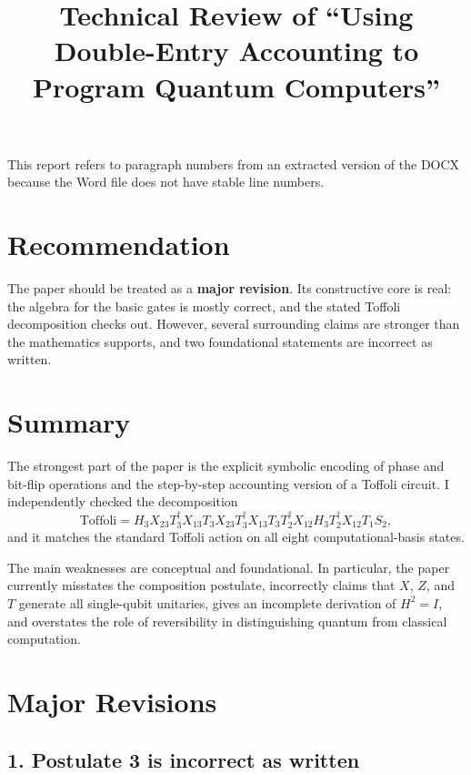 \documentclass[11pt]{article}
\begin{document}
\title{Technical Review of ``Using Double-Entry Accounting to Program Quantum Computers''}
\author{}
\date{}
\maketitle

This report refers to paragraph numbers from an extracted version of the DOCX because the Word file does not have stable line numbers.

\section*{Recommendation}

The paper should be treated as a \textbf{major revision}. Its constructive core is real: the algebra for the basic gates is mostly correct, and the stated Toffoli decomposition checks out. However, several surrounding claims are stronger than the mathematics supports, and two foundational statements are incorrect as written.

\section*{Summary}

The strongest part of the paper is the explicit symbolic encoding of phase and bit-flip operations and the step-by-step accounting version of a Toffoli circuit. I independently checked the decomposition
\[
\mathrm{Toffoli}
=
H_3 X_{23} T_3^\dagger X_{13} T_3 X_{23} T_3^\dagger X_{13} T_3
T_2^\dagger X_{12} H_3 T_2^\dagger X_{12} T_1 S_2,
\]
and it matches the standard Toffoli action on all eight computational-basis states.

The main weaknesses are conceptual and foundational. In particular, the paper currently misstates the composition postulate, incorrectly claims that \(X\), \(Z\), and \(T\) generate all single-qubit unitaries, gives an incomplete derivation of \(H^2=I\), and overstates the role of reversibility in distinguishing quantum from classical computation.

\section*{Major Revisions}

\subsection*{1. Postulate 3 is incorrect as written}
\end{document}
